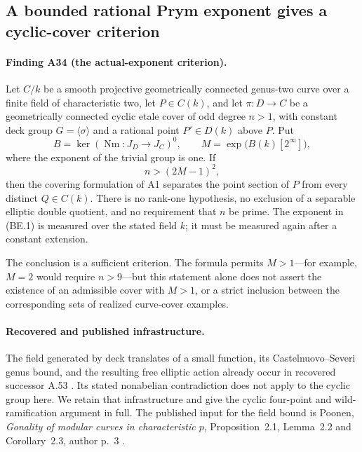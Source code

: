 \subsection{A bounded rational Prym exponent gives a cyclic-cover criterion}
\label{sec:bounded-prym-exponent}

\paragraph{Finding A34 (the actual-exponent criterion).}
Let $C/k$ be a smooth projective geometrically connected genus-two
curve over a finite field of characteristic two, let $P\in C(k)$,
and let $\pi:D\to C$ be a geometrically connected cyclic etale cover
of odd degree $n>1$, with constant deck group
$G=\langle\sigma\rangle$ and a rational point $P'\in D(k)$ above $P$.
Put
\[
 B=\ker(\operatorname{Nm}:J_D\longrightarrow J_C)^0,
 \qquad M=\exp\bigl(B(k)[2^\infty]\bigr),
 \tag{BE.1}
\]
where the exponent of the trivial group is one. If
\[
                         n>(2M-1)^2,
 \tag{BE.2}
\]
then the covering formulation of A1 separates the point section
of $P$ from every distinct $Q\in C(k)$.
There is no rank-one hypothesis, no exclusion of a separable
elliptic double quotient, and no requirement that $n$ be prime.
The exponent in (BE.1) is measured over the stated field $k$;
it must be measured again after a constant extension.

The conclusion is a sufficient criterion. The formula permits
$M>1$---for example, $M=2$ would require $n>9$---but this statement
alone does not assert the existence of an admissible cover with
$M>1$, or a strict inclusion between the corresponding sets of
realized curve-cover examples.

\paragraph{Recovered and published infrastructure.}
The field generated by deck translates of a small function, its
Castelnuovo--Severi genus bound, and the resulting free elliptic
action already occur in recovered successor A.53
\cite[A.53]{ASrun}. Its stated nonabelian contradiction does not
apply to the cyclic group here. We retain that infrastructure and
give the cyclic four-point and wild-ramification argument in full.
The published input for the field bound is Poonen,
\emph{Gonality of modular curves in characteristic $p$},
Proposition~2.1, Lemma~2.2 and Corollary~2.3, author p.~3
\cite{Poonen2007Gonality}.

